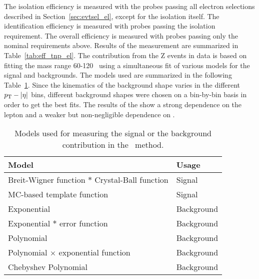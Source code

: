 The isolation efficiency is measured with the probes passing all electron
selections described in Section~\ref{sec:evtsel_el}, except for the isolation
itself. The identification efficiency is measured with probes passing the
isolation requirement. The overall efficiency is measured with probes passing
only the nominal requirements above. Results of the measurement are summarized
in Table~\ref{tab:eff_tnp_el}. The contribution from the Z events in data is
based on fitting the mass range 60-120 \GeVcc~using a simultaneous fit of
various models for the signal and backgrounds. The models used are summarized
in the following Table~\ref{tab:eff_tnp_models}. Since the kinematics of the
background shape varies in the different $p_{\mathrm{T}}-\left|\eta\right|$ bins, different background
shapes were chosen on a bin-by-bin basis in order to get the best fits. The
results of the \tnp show a strong dependence on the lepton \pt and a weaker but
non-negligible dependence on \aeta.
\begin{table}[!htb]
\caption[Models used for measuring the signal or the background contribution in the \tnp~method]
{\label{tab:eff_tnp_models}
Models used for measuring the signal or the background contribution in the \tnp~method.
}
\begin{center}
\begin{tabular}{l|l}
\hline\hline
Model                                              & Usage      \\ \hline
Breit-Wigner function $\ast$ Crystal-Ball function & Signal     \\
MC-based template function                         & Signal     \\ \hline
Exponential                                        & Background \\
Exponential $\ast$ error function                  & Background \\
Polynomial                                         & Background \\
Polynomial $\times$ exponential function           & Background \\
Chebyshev Polynomial                               & Background \\
\hline\hline
\end{tabular}
\end{center}
\end{table}
